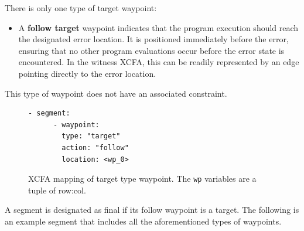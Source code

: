 There is only one type of target waypoint:
\begin{itemize}
  \item A \textbf{follow target} waypoint indicates that the program execution should reach 
    the designated error location. It is positioned immediately before the error, 
    ensuring that no other program evaluations occur before the error state is encountered. 
    In the witness XCFA, this can be readily represented by an edge pointing directly to the error location.
\end{itemize}
This type of waypoint does not have an associated constraint.

\begin{figure}[H]
  \centering
  \begin{minipage}[t]{0.35\textwidth}
    \begin{lstlisting}[style=c, columns=flexibl]
    - segment:
      - waypoint:
        type: "target"
        action: "follow"
        location: <wp_0>
    \end{lstlisting}
    \end{minipage}
    \hspace{2cm}
  \caption{XCFA mapping of target type waypoint. The \texttt{wp} variables are a tuple of row:col.}
  \label{fig:combined}
\end{figure}


A segment is designated as final if its follow waypoint is a target.
The following is an example segment that includes all the aforementioned types of waypoints.

